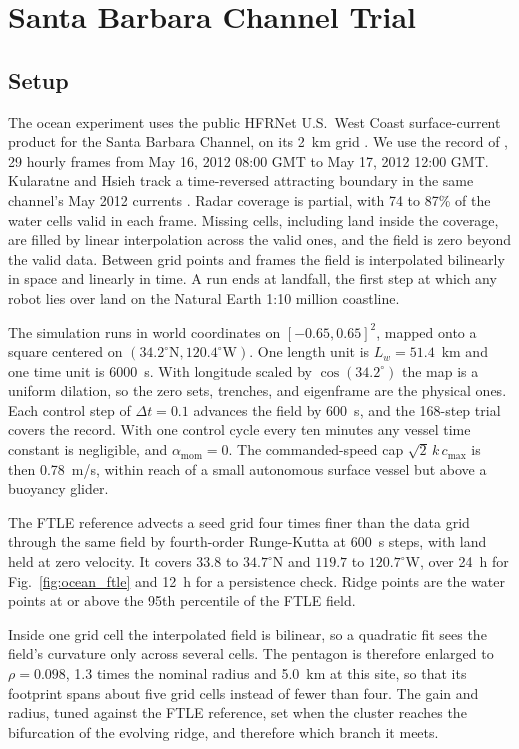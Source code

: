 \documentclass[lettersize,journal]{IEEEtran}
\begin{document}
\section{Santa Barbara Channel Trial}
\label{sec:ocean}

\subsection{Setup}
\label{sec:ocean_sim}

The ocean experiment uses the public HFRNet U.S.~West Coast surface-current
product for the Santa Barbara Channel, on its 2~km grid \cite{34,38}. We
use the record of \cite{26}, 29 hourly frames from May 16, 2012 08:00 GMT
to May 17, 2012 12:00 GMT. Kularatne and Hsieh track a time-reversed
attracting boundary in the same channel's May 2012 currents \cite{29}.
Radar coverage is partial, with 74 to 87\% of the water cells valid in
each frame. Missing cells, including land inside the coverage, are filled
by linear interpolation across the valid ones, and the field is zero
beyond the valid data. Between grid points and frames the field is
interpolated bilinearly in space and linearly in time. A run ends at
landfall, the first step at which any robot lies over land on the Natural
Earth 1:10 million coastline.

The simulation runs in world coordinates on $[-0.65, 0.65]^2$, mapped onto
a square centered on $(34.2^{\circ}\mathrm{N}, 120.4^{\circ}\mathrm{W})$.
One length unit is $L_w = 51.4$~km and one time unit is 6000~s. With
longitude scaled by $\cos(34.2^{\circ})$ the map is a uniform dilation, so
the zero sets, trenches, and eigenframe are the physical ones. Each control
step of $\Delta t = 0.1$ advances the field by 600~s, and the 168-step trial
covers the record. With one control cycle every ten minutes any vessel
time constant is negligible, and $\alpha_{\text{mom}} = 0$. The
commanded-speed cap $\sqrt{2}\,k\,c_{\max}$ is then 0.78~m/s, within reach
of a small autonomous surface vessel but above a buoyancy glider.

The FTLE reference advects a seed grid four times finer than the data grid
through the same field by fourth-order Runge-Kutta at 600~s steps, with
land held at zero velocity. It covers $33.8$ to $34.7^{\circ}$N and $119.7$
to $120.7^{\circ}$W, over 24~h for Fig.~\ref{fig:ocean_ftle} and 12~h for
a persistence check. Ridge points are the water points at or above the
95th percentile of the FTLE field.

Inside one grid cell the interpolated field is bilinear, so a quadratic fit
sees the field's curvature only across several cells. The pentagon is
therefore enlarged to $\rho = 0.098$, 1.3 times the nominal radius and
5.0~km at this site, so that its footprint spans about five grid cells
instead of fewer than four. The gain and radius, tuned against the FTLE
reference, set when the cluster reaches the bifurcation of the evolving
ridge, and therefore which branch it meets.
\end{document}
